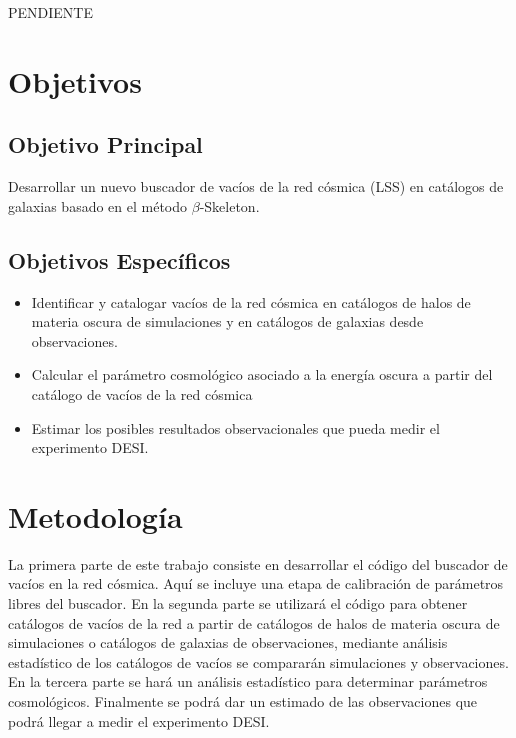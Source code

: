 \documentclass[preprint]{aastex62}
\begin{document}
  \medskip
  PENDIENTE
  \medskip
  
  \section{Objetivos}

  \subsection{Objetivo Principal}
  Desarrollar un nuevo buscador de vacíos de la red cósmica (LSS) en catálogos de galaxias
  basado en el método $\beta$-Skeleton.
  
  \subsection{Objetivos Específicos}

  \begin{itemize}

      \item Identificar y catalogar vacíos de la red cósmica en catálogos de halos de materia oscura de
  simulaciones y en catálogos de galaxias desde observaciones.

      \item Calcular el parámetro cosmológico asociado a la energía oscura a partir del catálogo de
  vacíos de la red cósmica

    \item  Estimar los posibles resultados observacionales que pueda medir el experimento DESI.
  \end{itemize}
  
  \section{Metodología}

  La primera parte de este trabajo consiste en desarrollar el código del buscador de vacíos
  en la red cósmica. Aquí se incluye una etapa de calibración de parámetros libres del buscador.
  En la segunda parte se utilizará el código para obtener catálogos
  de vacíos de la red a partir de catálogos de halos de materia oscura de simulaciones o
  catálogos de galaxias de observaciones, mediante análisis estadístico de los catálogos de
  vacíos se compararán simulaciones y observaciones.
  En la tercera parte se hará un análisis estadístico para determinar parámetros cosmológicos.
  Finalmente se podrá dar un estimado de las observaciones que podrá llegar a medir el
  experimento DESI.
\end{document}
